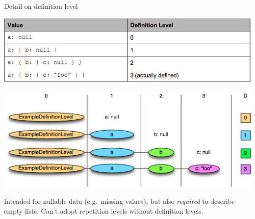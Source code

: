 \documentclass{beamer}
\begin{document}
\begin{frame}{Detail on definition level}
\vspace{0.2 cm}
\begin{center}
\includegraphics[width=0.85\linewidth]{repetition_and_definition_4.png}

\vspace{0.3 cm}
\mbox{\includegraphics[width=0.8\linewidth]{repetition_and_definition_5.png}\hspace{0.5 cm}}
\end{center}

\vspace{-0.2 cm}
Intended for nullable data (e.g.\ missing values), but also {\it required} to describe empty lists. Can't adopt repetition levels without definition levels.
\end{frame}
\end{document}
